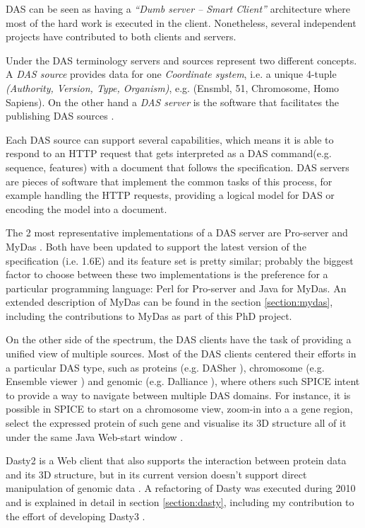 DAS can be seen as having a \emph{``Dumb server -- Smart Client''} architecture where most of the hard work is executed in the client. Nonetheless, several independent projects have contributed to both clients and servers. 

Under the DAS terminology servers and sources represent two different concepts. A \emph{DAS source} provides data for one \emph{Coordinate system}, i.e. a unique 4-tuple \emph{(Authority, Version, Type, Organism)}, e.g. (Ensmbl, 51, Chromosome, Homo Sapiens). On the other hand a \emph{DAS server} is the software that facilitates the publishing DAS sources \cite{DASCS2009}.

Each DAS source can support several capabilities, which means it is able to respond to an HTTP request that gets interpreted as a DAS command(e.g. sequence, features) with a document that follows the specification. DAS servers are pieces of software that implement the common tasks of this process, for example handling the HTTP requests, providing a logical model for DAS or encoding the model into a document.

The 2 most representative implementations of a DAS server are Pro-server \cite{FIN2007} and MyDas \cite{SAL2012}. Both have been updated to support the latest version of the specification (i.e. 1.6E) and its feature set is pretty similar; probably the biggest factor to choose between these two implementations is the preference for a particular programming language: Perl for Pro-server and Java for MyDas. An extended description of MyDas can be found in the section \ref{section:mydas}, including the contributions to MyDas as part of this PhD project.

On the other side of the spectrum, the DAS clients have the task of providing a unified view of multiple sources. Most of the DAS clients centered their efforts in a particular DAS type, such as proteins (e.g. DASher \cite{MES2009}), chromosome (e.g. Ensemble viewer \cite{FLI2011}) and genomic (e.g. Dalliance \cite{DOW2011}), where others such SPICE intent to provide a way to navigate between multiple DAS domains. For instance, it is possible in SPICE to start on a chromosome view, zoom-in into a a gene region, select the expressed protein of such gene and visualise its 3D structure all of it under the same Java Web-start window \cite{PRL2005}.

Dasty2 is a Web client that also supports the interaction between protein data and its 3D structure, but in its current version doesn't support direct manipulation of genomic data \cite{JIM2008}. A refactoring of Dasty was executed during 2010 and is explained in detail in section \ref{section:dasty}, including my contribution to the effort of developing Dasty3 \cite{VIL2011}. 

